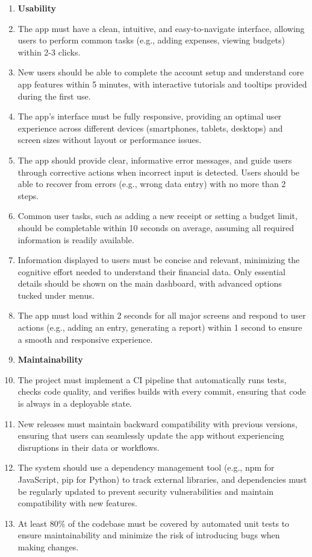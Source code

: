 \documentclass[12pt]{article}
\begin{document}
\begin{enumerate}[label=NFR\arabic*]
  \item[]\textbf{Usability}
  \item The app must have a clean, intuitive, and easy-to-navigate interface,
  allowing users to perform common tasks (e.g., adding expenses, viewing
  budgets) within 2-3 clicks.
  \item New users should be able to complete the account setup and understand
  core app features within 5 minutes, with interactive tutorials and tooltips
  provided during the first use.
  \item The app’s interface must be fully responsive, providing an optimal user
  experience across different devices (smartphones, tablets, desktops) and
  screen sizes without layout or performance issues.
  \item The app should provide clear, informative error messages, and guide
  users through corrective actions when incorrect input is detected. Users
  should be able to recover from errors (e.g., wrong data entry) with no more
  than 2 steps.
  \item Common user tasks, such as adding a new receipt or setting a budget
  limit, should be completable within 10 seconds on average, assuming all
  required information is readily available.
  \item Information displayed to users must be concise and relevant, minimizing
  the cognitive effort needed to understand their financial data. Only essential
  details should be shown on the main dashboard, with advanced options tucked
  under menus.
  \item The app must load within 2 seconds for all major screens and respond to
  user actions (e.g., adding an entry, generating a report) within 1 second to
  ensure a smooth and responsive experience.


  \item[] \textbf{Maintainability}
  \item The project must implement a CI pipeline that automatically runs tests,
  checks code quality, and verifies builds with every commit, ensuring that code
  is always in a deployable state.
  \item New releases must maintain backward compatibility with previous
  versions, ensuring that users can seamlessly update the app without
  experiencing disruptions in their data or workflows.
  \item The system should use a dependency management tool (e.g., npm for
  JavaScript, pip for Python) to track external libraries, and dependencies must
  be regularly updated to prevent security vulnerabilities and maintain
  compatibility with new features.
  \item At least 80\% of the codebase must be covered by automated unit tests to
  ensure maintainability and minimize the risk of introducing bugs when making
  changes.


\end{enumerate}
\end{document}
